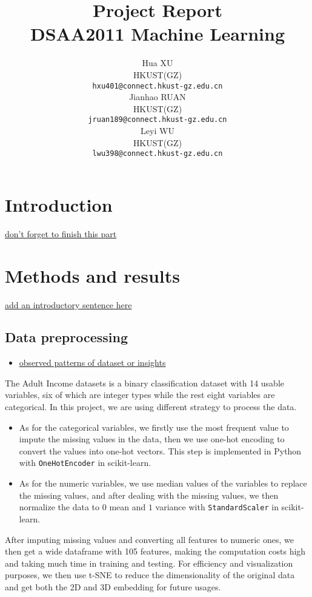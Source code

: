 \documentclass{article}
\title{Project Report \large \\ DSAA2011 Machine Learning}
\author{%
   Hua XU \\
   HKUST(GZ) \\
   \texttt{hxu401@connect.hkust-gz.edu.cn} \\
   \And
   Jianhao RUAN \\
   HKUST(GZ) \\
   \texttt{jruan189@connect.hkust-gz.edu.cn} \\
   \And
   Leyi WU \\
   HKUST(GZ) \\
   \texttt{lwu398@connect.hkust-gz.edu.cn} \\
}
\begin{document}
\maketitle

\section{Introduction}

\underline{don't forget to finish this part}


\section{Methods and results}

\underline{add an introductory sentence here}

\subsection{Data preprocessing}

\begin{itemize}
    \item \underline{observed patterns of dataset or insights}
\end{itemize}

The Adult Income datasets is a binary classification dataset with 14 usable variables, six of which are integer types while the rest eight variables are categorical. In this project, we are using different strategy to process the data.

\begin{itemize}
    \item As for the categorical variables, we firstly use the most frequent value to impute the missing values in the data, then we use one-hot encoding to convert the values into one-hot vectors. This step is implemented in Python with \texttt{OneHotEncoder} in scikit-learn.
    \item As for the numeric variables, we use median values of the variables to replace the missing values, and after dealing with the missing values, we then normalize the data to $0$ mean and $1$ variance with \texttt{StandardScaler} in scikit-learn.
\end{itemize}

After imputing missing values and converting all features to numeric ones, we then get a wide dataframe with 105 features, making the computation costs high and taking much time in training and testing. For efficiency and visualization purposes, we then use t-SNE to reduce the dimensionality of the original data and get both the 2D and 3D embedding for future usages.
\end{document}
